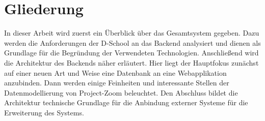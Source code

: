 \section{Gliederung}
In dieser Arbeit wird zuerst ein Überblick über das Gesamtsystem gegeben. Dazu werden die Anforderungen der D-School an das Backend analysiert und dienen als Grundlage für die Begründung der Verwendeten Technologien. Anschließend wird die Architektur des Backends näher erläutert. Hier liegt der Hauptfokus zunächst auf einer neuen Art und Weise eine Datenbank an eine Webapplikation anzubinden. Dann werden einige Feinheiten und interessante Stellen der Datenmodellierung von Project-Zoom beleuchtet. Den Abschluss bildet die Architektur technische Grundlage für die Anbindung externer Systeme für die Erweiterung des Systems.
